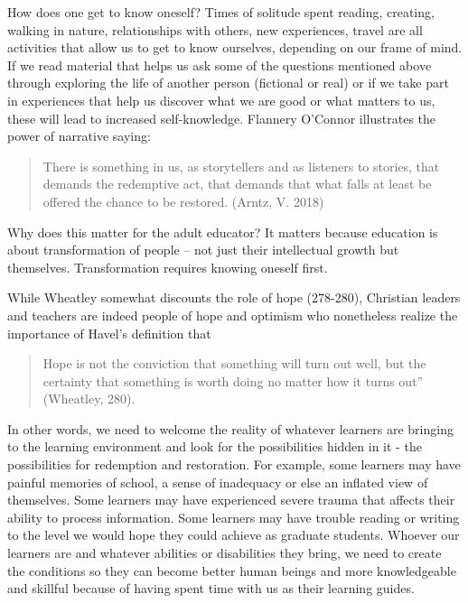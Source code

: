 \documentclass[
]{book}
\begin{document}
How does one get to know oneself? Times of solitude spent reading, creating, walking in nature, relationships with others, new experiences, travel are all activities that allow us to get to know ourselves, depending on our frame of mind. If we read material that helps us ask some of the questions mentioned above through exploring the life of another person (fictional or real) or if we take part in experiences that help us discover what we are good or what matters to us, these will lead to increased self-knowledge. Flannery O'Connor illustrates the power of narrative saying:

\begin{quote}
There is something in us, as storytellers and as listeners to stories, that demands the redemptive act, that demands that what falls at least be offered the chance to be restored. (Arntz, V. 2018)
\end{quote}

Why does this matter for the adult educator? It matters because education is about transformation of people -- not just their intellectual growth but themselves. Transformation requires knowing oneself first.

While Wheatley somewhat discounts the role of hope (278-280), Christian leaders and teachers are indeed people of hope and optimism who nonetheless realize the importance of Havel's definition that

\begin{quote}
Hope is not the conviction that something will turn out well, but the certainty that something is worth doing no matter how it turns out'' (Wheatley, 280).
\end{quote}

In other words, we need to welcome the reality of whatever learners are bringing to the learning environment and look for the possibilities hidden in it - the possibilities for redemption and restoration. For example, some learners may have painful memories of school, a sense of inadequacy or else an inflated view of themselves. Some learners may have experienced severe trauma that affects their ability to process information. Some learners may have trouble reading or writing to the level we would hope they could achieve as graduate students. Whoever our learners are and whatever abilities or disabilities they bring, we need to create the conditions so they can become better human beings and more knowledgeable and skillful because of having spent time with us as their learning guides.
\end{document}
